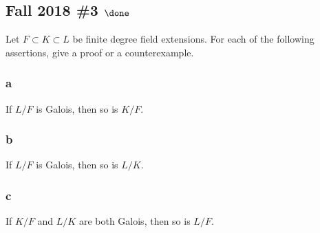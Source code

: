 \hypertarget{fall-2018-3-done}{%
\subsection{\texorpdfstring{Fall 2018 \#3
\(\done\)}{Fall 2018 \#3 \textbackslash done}}\label{fall-2018-3-done}}

Let \(F \subset K \subset L\) be finite degree field extensions. For
each of the following assertions, give a proof or a counterexample.

\hypertarget{a-57}{%
\subsubsection{a}\label{a-57}}

If \(L/F\) is Galois, then so is \(K/F\).

\hypertarget{b-47}{%
\subsubsection{b}\label{b-47}}

If \(L/F\) is Galois, then so is \(L/K\).

\hypertarget{c-31}{%
\subsubsection{c}\label{c-31}}

If \(K/F\) and \(L/K\) are both Galois, then so is \(L/F\).

